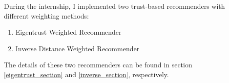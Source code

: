 	During the internship, I implemented two trust-based recommenders with different weighting methods:
	\begin{enumerate}
		\item Eigentrust Weighted Recommender
		\item Inverse Distance Weighted Recommender
	\end{enumerate} 
	The details of these two recommenders can be found in section \ref{eigentrust_section} and \ref{inverse_section}, respectively.